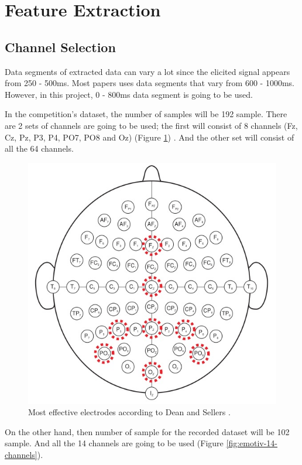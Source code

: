 \section{Feature Extraction}
\subsection{Channel Selection}
\label{subsection:channel-selection}
Data segments of extracted data can vary a lot since the elicited signal appears from 250 - 500ms. Most papers \cite{inproceedings1, inproceedings2, article1, article2} uses data segments that vary from 600 - 1000ms. However, in this project, 0 - 800ms data segment is going to be used.\par
In the competition's dataset, the number of samples will be 192 sample. There are 2 sets of channels are going to be used; the first will consist of 8 channels (Fz, Cz, Pz, P3, P4, PO7, PO8 and
Oz) (Figure \ref{fig:competition-8-channels}) \cite{inproceedings1, article1}. And the other set will consist of all the 64 channels.\par
\begin{figure}
    \centering
    \includegraphics[width=\figureWidth]{images/approach/competition_8_channels.jpg}
    \caption{Most effective electrodes according to Dean and Sellers \cite{article1}.}
    \label{fig:competition-8-channels}
\end{figure}
On the other hand, then number of sample for the recorded dataset will be 102 sample. And all the 14 channels are going to be used (Figure \ref{fig:emotiv-14-channels}).
